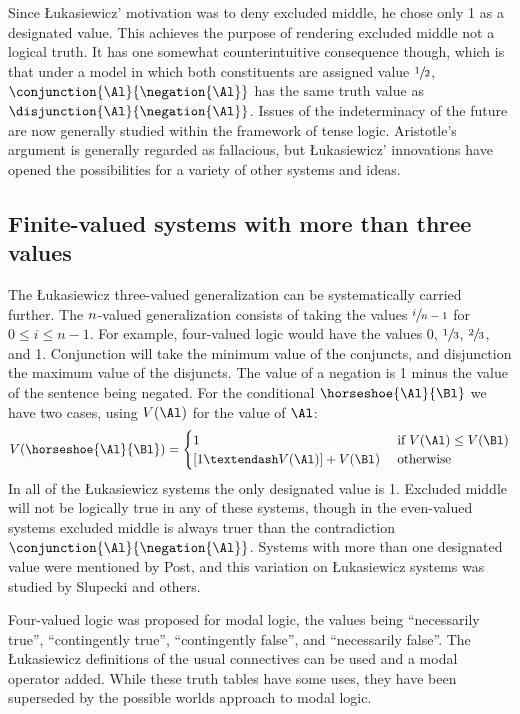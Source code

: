 Since \L{}ukasiewicz' motivation was to deny excluded middle, he chose only 1 as a designated value. 
This achieves the purpose of rendering excluded middle not a logical truth. 
It has one somewhat counterintuitive consequence though, which is that under a model in which both constituents are assigned value $\sfrac{1}{2}$, $\conjunction{\Al}{\negation{\Al}}$ has the same truth value as $\disjunction{\Al}{\negation{\Al}}$. 
Issues of the indeterminacy of the future are now generally studied within the framework of tense logic. 
Aristotle's argument is generally regarded as fallacious, but \L{}ukasiewicz' innovations have opened the possibilities for a variety of other systems and ideas. 

\subsection{Finite-valued systems with more than three values}

The \L{}ukasiewicz three-valued generalization can be systematically carried further. 
The $n$-valued generalization consists of taking the values $\sfrac{i}{n-1}$ for $0 \leq i \leq n-1$. 
For example, four-valued logic would have the values 0, $\sfrac{1}{3}$, $\sfrac{2}{3}$, and 1. 
Conjunction will take the minimum value of the conjuncts, and disjunction the maximum value of the disjuncts. 
The value of a negation is 1 minus the value of the sentence being negated. 
For the conditional $\horseshoe{\Al}{\Bl}$ we have two cases, using $V(\Al)$ for the value of $\Al$:
\[V(\horseshoe{\Al}{\Bl}) = 
\begin{cases}
1 & \text{ if } V(\Al) \leq V(\Bl) \\
[1 – V(\Al)]  + V($\Bl$) & \text{ otherwise}
\end{cases}\]
In all of the \L{}ukasiewicz systems the only designated value is 1. 
Excluded middle will not be logically true in any of these systems, though in the even-valued systems excluded middle is always truer than the contradiction $\conjunction{\Al}{\negation{\Al}}$. 
Systems with more than one designated value were mentioned by Post, and this variation on \L{}ukasiewicz systems was studied by Slupecki and others. 

Four-valued logic was proposed for modal logic, the values being ``necessarily true'', ``contingently true'', ``contingently false'', and ``necessarily false''. 
The \L{}ukasiewicz definitions of the usual connectives can be used and a modal operator added. 
While these truth tables have some uses, they have been superseded by the possible worlds approach to modal logic. 

